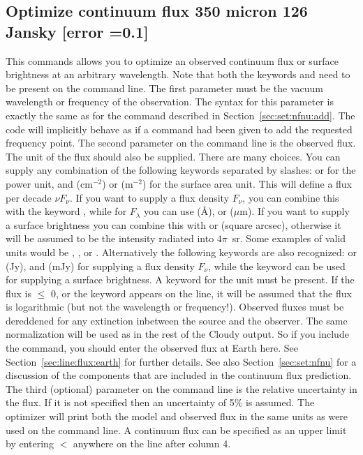 \subsection{Optimize continuum flux 350 micron 126 Jansky [error =0.1]}
\label{sec:opt:cont:flux}

This commands allows you to optimize an observed continuum flux or surface brightness at an
arbitrary wavelength. Note that both the keywords  and
 need to be present on the command line. The first parameter
must be the vacuum wavelength or frequency of the observation. The syntax for this
parameter is exactly the same as for the  command
described in Section~\ref{sec:set:nfnu:add}. The code will implicitly behave
as if a  command had been given to add the requested
frequency point. The second parameter
on the command line is the observed flux. The unit of the flux should also
be supplied. There are many choices. You can supply any combination of the
following keywords separated by slashes:  or 
for the power unit, and  (cm$^{-2}$) or 
(m$^{-2}$) for the surface area unit. This will define a flux per decade $\nu
F_\nu$. If you want to supply a flux density $F_\nu$, you can combine this
with the keyword , while for $F_\lambda$ you can use 
(\AA),  or  ($\mu$m). If you want to supply a surface
brightness you can combine this with  or  (square arcsec),
otherwise it will be assumed to be the intensity radiated into $4\pi$~sr.
Some examples of valid units would be ,
, or . Alternatively the
following keywords are also recognized:  or
 (Jy), and  (mJy) for supplying a flux density $F_\nu$,
while the keyword  can be used for supplying a surface
brightness. A keyword for the unit must be present.
If the flux is $\leq$ 0, or the keyword
 appears on the line, it will be assumed that the flux is
logarithmic (but not the wavelength or frequency!). Observed fluxes must be
dereddened for any extinction inbetween the source and the observer. The same
normalization will be used as in the rest of the Cloudy output. So if you
include the  command, you should enter the
observed flux at Earth here. See Section~\ref{sec:line:flux:earth} for further
details. See also Section~\ref{sec:set:nfnu} for a discussion of the
components that are included in the continuum flux prediction. The third
(optional) parameter on the command line is the relative uncertainty in the
flux. If it is not specified then an uncertainty of 5\% is assumed. The optimizer
will print both the model and observed flux in the same units as were used on the
command line.
A continuum flux can be specified as an upper limit by entering
$<$ anywhere on the line after column 4.


